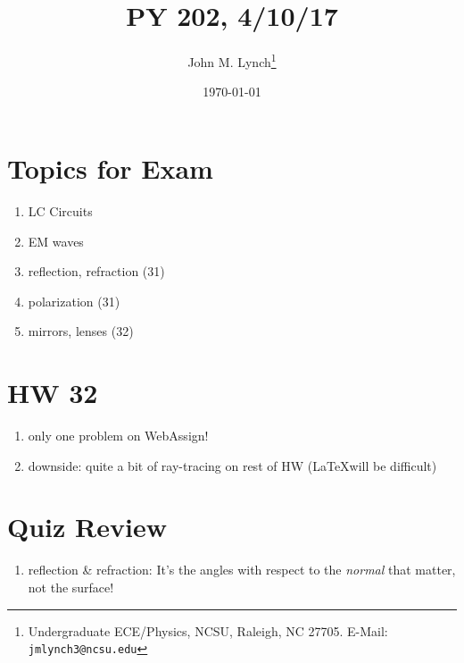 \documentclass[twocolumn,11pt]{article}
\title{PY 202, 4/10/17}
\author{John M. Lynch\footnote{Undergraduate ECE/Physics, NCSU, Raleigh, NC 27705. E-Mail: \texttt{jmlynch3@ncsu.edu}}}
\date{\today}
\begin{document}
  \maketitle
  
  \section*{Topics for Exam}
  	\begin{enumerate}
  		\item LC Circuits
		\item EM waves
		\item reflection, refraction (31)
		\item polarization (31)
		\item mirrors, lenses (32)
  	\end{enumerate}
	
	\section*{HW 32}
		\begin{enumerate}
			\item only one problem on WebAssign!
			\item downside: quite a bit of ray-tracing on rest of HW (\LaTeX will be difficult)
		\end{enumerate}
	
	\section*{Quiz Review}
		\begin{enumerate}
			\item reflection \& refraction: It's the angles with respect to the \emph{normal} that
				  matter, not the surface!
		\end{enumerate}
	
\end{document}
